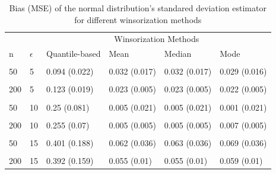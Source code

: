 \documentclass[notitlepage,12pt]{jedm}
\begin{document}
\begin{table}[H]

\caption{\label{tab:unnamed-chunk-5}Bias (MSE) of the normal distribution's standared deviation estimator for different winsorization methods}
\centering
\begin{tabular}[t]{l|l|l|l|l|l}
\hline
\multicolumn{2}{c|}{ } & \multicolumn{4}{c}{Winsorization  Methods} \\
\cline{3-6}
n & $\epsilon$ & Quantile-based & Mean & Median & Mode\\
\hline
\cellcolor{gray!6}{20} & \cellcolor{gray!6}{5} & \cellcolor{gray!6}{0.095 (0.047)} & \cellcolor{gray!6}{0.078 (0.05)} & \cellcolor{gray!6}{0.077 (0.05)} & \cellcolor{gray!6}{0.072 (0.049)}\\
\hline
50 & 5 & 0.094 (0.022) & 0.032 (0.017) & 0.032 (0.017) & 0.029 (0.016)\\
\hline
\cellcolor{gray!6}{100} & \cellcolor{gray!6}{5} & \cellcolor{gray!6}{0.125 (0.023)} & \cellcolor{gray!6}{0.026 (0.01)} & \cellcolor{gray!6}{0.026 (0.01)} & \cellcolor{gray!6}{0.024 (0.01)}\\
\hline
200 & 5 & 0.123 (0.019) & 0.023 (0.005) & 0.023 (0.005) & 0.022 (0.005)\\
\hline
\cellcolor{gray!6}{20} & \cellcolor{gray!6}{10} & \cellcolor{gray!6}{0.226 (0.101)} & \cellcolor{gray!6}{0.014 (0.053)} & \cellcolor{gray!6}{0.013 (0.053)} & \cellcolor{gray!6}{0.007 (0.053)}\\
\hline
50 & 10 & 0.25 (0.081) & 0.005 (0.021) & 0.005 (0.021) & 0.001 (0.021)\\
\hline
\cellcolor{gray!6}{100} & \cellcolor{gray!6}{10} & \cellcolor{gray!6}{0.252 (0.073)} & \cellcolor{gray!6}{0.006 (0.01)} & \cellcolor{gray!6}{0.006 (0.01)} & \cellcolor{gray!6}{0.009 (0.01)}\\
\hline
200 & 10 & 0.255 (0.07) & 0.005 (0.005) & 0.005 (0.005) & 0.007 (0.005)\\
\hline
\cellcolor{gray!6}{20} & \cellcolor{gray!6}{15} & \cellcolor{gray!6}{0.35 (0.183)} & \cellcolor{gray!6}{0.004 (0.064)} & \cellcolor{gray!6}{0.005 (0.064)} & \cellcolor{gray!6}{0.015 (0.065)}\\
\hline
50 & 15 & 0.401 (0.188) & 0.062 (0.036) & 0.063 (0.036) & 0.069 (0.036)\\
\hline
\cellcolor{gray!6}{100} & \cellcolor{gray!6}{15} & \cellcolor{gray!6}{0.387 (0.162)} & \cellcolor{gray!6}{0.048 (0.016)} & \cellcolor{gray!6}{0.049 (0.016)} & \cellcolor{gray!6}{0.053 (0.016)}\\
\hline
200 & 15 & 0.392 (0.159) & 0.055 (0.01) & 0.055 (0.01) & 0.059 (0.01)\\
\hline
\end{tabular}
\end{table}
\end{document}
